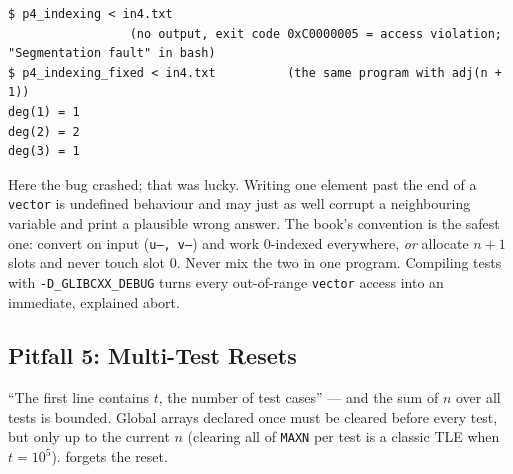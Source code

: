 \begin{diagrambox}
\end{diagrambox}

\begin{lstlisting}[style=trace]
$ p4_indexing < in4.txt
                 (no output, exit code 0xC0000005 = access violation; "Segmentation fault" in bash)
$ p4_indexing_fixed < in4.txt          (the same program with adj(n + 1))
deg(1) = 1
deg(2) = 2
deg(3) = 1
\end{lstlisting}

Here the bug crashed; that was lucky. Writing one element past the end of a \texttt{vector} is undefined behaviour and may just as well corrupt a neighbouring variable and print a plausible wrong answer. The book's convention is the safest one: convert on input (\texttt{u--, v--}) and work 0-indexed everywhere, \emph{or} allocate $n+1$ slots and never touch slot 0. Never mix the two in one program. Compiling tests with \texttt{-D\_GLIBCXX\_DEBUG} turns every out-of-range \texttt{vector} access into an immediate, explained abort.

\subsection{Pitfall 5: Multi-Test Resets}
\label{ssec:ts-p5}

``The first line contains $t$, the number of test cases'' --- and the sum of $n$ over all tests is bounded. Global arrays declared once must be cleared before every test, but only up to the current $n$ (clearing all of \texttt{MAXN} per test is a classic TLE when $t=10^5$).  forgets the reset.

